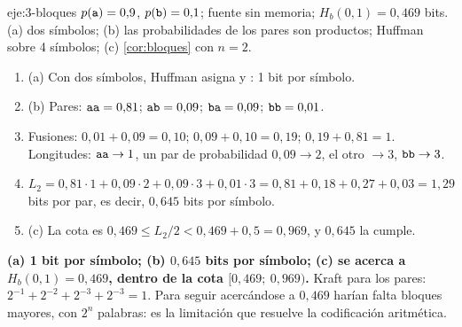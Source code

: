 \begin{solucion}{eje:3-bloques}
\datos $p(\textnormal{\texttt{a}})=0{,}9$, $p(\textnormal{\texttt{b}})=0{,}1$; fuente sin memoria; $H_b(0{,}1)=0{,}469$ bits.
\planteamiento (a) dos símbolos; (b) las probabilidades de los pares son productos; Huffman sobre 4 símbolos; (c) \cref{cor:bloques} con $n=2$.
\pasos
\begin{enumerate}[label=\arabic*.]
  \item (a) Con dos símbolos, Huffman asigna  y : 1 bit por símbolo.
  \item (b) Pares: $\textnormal{\texttt{aa}}=0{,}81$; $\textnormal{\texttt{ab}}=0{,}09$; $\textnormal{\texttt{ba}}=0{,}09$; $\textnormal{\texttt{bb}}=0{,}01$.
  \item Fusiones: $0{,}01+0{,}09=0{,}10$; $0{,}09+0{,}10=0{,}19$; $0{,}19+0{,}81=1$. Longitudes: $\textnormal{\texttt{aa}}\to 1$, un par de probabilidad $0{,}09\to 2$, el otro $\to 3$, $\textnormal{\texttt{bb}}\to 3$.
  \item $L_2=0{,}81\cdot 1+0{,}09\cdot 2+0{,}09\cdot 3+0{,}01\cdot 3=0{,}81+0{,}18+0{,}27+0{,}03=1{,}29$ bits por par, es decir, $0{,}645$ bits por símbolo.
  \item (c) La cota es $0{,}469\le L_2/2<0{,}469+0{,}5=0{,}969$, y $0{,}645$ la cumple.
\end{enumerate}
\resultado \textbf{(a) 1 bit por símbolo; (b) $0{,}645$ bits por símbolo; (c) se acerca a $H_b(0{,}1)=0{,}469$, dentro de la cota $[0{,}469;\ 0{,}969)$.}
\comprobacion Kraft para los pares: $2^{-1}+2^{-2}+2^{-3}+2^{-3}=1$. Para seguir acercándose a $0{,}469$ harían falta bloques mayores, con $2^{n}$ palabras: es la limitación que resuelve la codificación aritmética.
\end{solucion}

